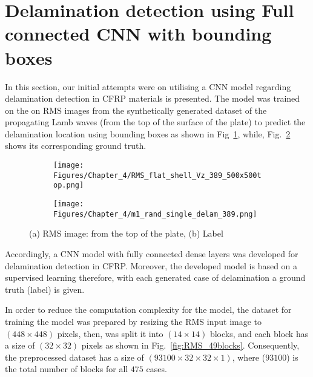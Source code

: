 \section{Delamination detection using Full connected CNN with bounding boxes}
\label{sec42}

In this section, our initial attempts were on utilising a CNN model regarding delamination detection in CFRP materials is presented.
The model was trained on the on RMS images from the synthetically generated dataset of the propagating Lamb waves (from the top of the surface of the plate) to predict the delamination location using bounding boxes as shown in Fig~\ref{fig:RMS_14}, while, Fig.~\ref{fig:label_14} shows its corresponding ground truth.
\begin{figure} [h!]
	\centering
	\begin{subfigure}[b]{0.47\textwidth}
		\centering
		\texttt{[image: Figures/Chapter\_4/RMS\_flat\_shell\_Vz\_389\_500x500top.png]}
		\caption{}
		\label{fig:RMS_14}
	\end{subfigure}
	\hfill
	\begin{subfigure}[b]{0.47\textwidth}
		\centering
		\texttt{[image: Figures/Chapter\_4/m1\_rand\_single\_delam\_389.png]}
		\caption{}
		\label{fig:label_14}
	\end{subfigure}
	\caption{(a) RMS image: from the top of the plate, (b) Label}
	\label{fig:RMS_GT}
\end{figure} 

Accordingly, a CNN model with fully connected dense layers was developed for delamination detection in CFRP.
Moreover, the developed model is based on a supervised learning therefore, with each generated case of delamination a ground truth (label) is given. 

In order to reduce the computation complexity for the model, the dataset for training the model was prepared by resizing the RMS input image to \((448\times 448)\) pixels,  then, was split it into \((14\times 14)\) blocks, and each block has a size of \((32\times 32)\) pixels as shown in Fig.~\ref{fig:RMS_49blocks}.
Consequently, the preprocessed dataset has a size of \((93100\times 32\times 32 \times 1)\), where (\(93100\)) is the total number of blocks for all \(475\) cases.

